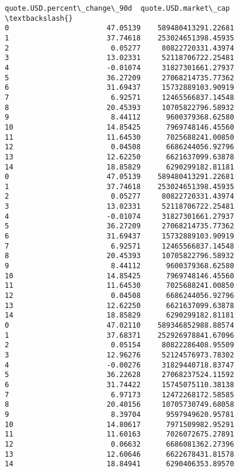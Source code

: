 \documentclass[11pt]{article}
\begin{document}
\begin{tcolorbox}[breakable, size=fbox, boxrule=.5pt, pad at break*=1mm, opacityfill=0]
\begin{Verbatim}[commandchars=\\\{\}]
    quote.USD.percent\_change\_90d  quote.USD.market\_cap  \textbackslash{}
0                       47.05139    589480413291.22681
1                       37.74618    253024651398.45935
2                        0.05277     80822720331.43974
3                       13.02331     52118706722.25481
4                       -0.01074     31827301661.27937
5                       36.27209     27068214735.77362
6                       31.69437     15732889103.90919
7                        6.92571     12465566837.14548
8                       20.45393     10705822796.58932
9                        8.44112      9600379368.62580
10                      14.85425      7969748146.45560
11                      11.64530      7025688241.00850
12                       0.04508      6686244056.92796
13                      12.62250      6621637099.63878
14                      18.85829      6290299182.81181
0                       47.05139    589480413291.22681
1                       37.74618    253024651398.45935
2                        0.05277     80822720331.43974
3                       13.02331     52118706722.25481
4                       -0.01074     31827301661.27937
5                       36.27209     27068214735.77362
6                       31.69437     15732889103.90919
7                        6.92571     12465566837.14548
8                       20.45393     10705822796.58932
9                        8.44112      9600379368.62580
10                      14.85425      7969748146.45560
11                      11.64530      7025688241.00850
12                       0.04508      6686244056.92796
13                      12.62250      6621637099.63878
14                      18.85829      6290299182.81181
0                       47.02110    589346852988.88574
1                       37.68371    252926978841.67096
2                        0.05154     80822286408.95509
3                       12.96276     52124576973.78302
4                       -0.00276     31829440718.83747
5                       36.22628     27068237524.11592
6                       31.74422     15745075110.38138
7                        6.97173     12472268172.58585
8                       20.40156     10705730749.68058
9                        8.39704      9597949620.95781
10                      14.80617      7971509982.95291
11                      11.60163      7026072675.27891
12                       0.06632      6686081362.27396
13                      12.60646      6622678431.81578
14                      18.84941      6290406353.89570


\end{Verbatim}
\end{tcolorbox}
\end{document}
